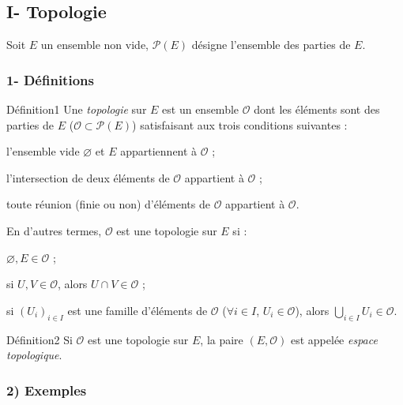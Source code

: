 \documentclass[11pt,a4paper]{article}
\newcommand{\Pp}{\mathscr{P}}
\newcommand{\Oo}{\mathscr{O}}
\begin{document}
\subsection*{I- Topologie}

Soit $E$ un ensemble non vide, $\Pp(E)$ désigne l'ensemble des parties de $E$.

\subsubsection*{1- Définitions}

\begin{enonce}{Définition}{1}
Une \emph{topologie} sur $E$ est un ensemble $\Oo$ dont les éléments sont des parties de $E$ ($\Oo\subset\Pp(E)$) satisfaisant aux trois conditions suivantes :
\begin{description}[leftmargin=1.4cm,labelwidth=1cm,style=sameline]
  \item[$O_1$ :] l'ensemble vide $\varnothing$ et $E$ appartiennent à $\Oo$ ;
  \item[$O_2$ :] l'intersection de deux éléments de $\Oo$ appartient à $\Oo$ ;
  \item[$O_3$ :] toute réunion (finie ou non) d'éléments de $\Oo$ appartient à $\Oo$.
\end{description}
\end{enonce}

En d'autres termes, $\Oo$ est une topologie sur $E$ si :
\begin{description}[leftmargin=1.4cm,labelwidth=1cm,style=sameline]
  \item[$O_1$ :] $\varnothing,E\in\Oo$ ;
  \item[$O_2$ :] si $U,V\in\Oo$, alors $U\cap V\in\Oo$ ;
  \item[$O_3$ :] si $(U_i)_{i\in I}$ est une famille d'éléments de $\Oo$ ($\forall i\in I$, $U_i\in\Oo$), alors $\displaystyle\bigcup_{i\in I}U_i\in\Oo$.
\end{description}

\begin{enonce}{Définition}{2}
Si $\Oo$ est une topologie sur $E$, la paire $(E,\Oo)$ est appelée \emph{espace topologique}.
\end{enonce}

\subsubsection*{2) Exemples}
\end{document}
